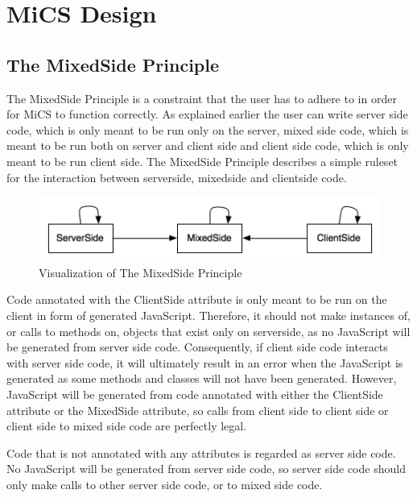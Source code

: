 \chapter{MiCS Design}

	\section{The MixedSide Principle} %
	\label{sub:the_mixedside_principle}
		The MixedSide Principle is a constraint that the user has to adhere to in order for MiCS to function correctly. As explained earlier the user can write server side code, which is only meant to be run only on the server, mixed side code, which is meant to be run both on server and client side and client side code, which is only meant to be run client side. The MixedSide Principle describes a simple ruleset for the interaction between serverside, mixedside and clientside code.

		\begin{figure}[H]
			\begin{center}
				\centerline{\includegraphics[width=12cm]{resources/images/MixedSidePrinciple.png}}
			\end{center}
			\caption{Visualization of The MixedSide Principle}
			\label{fig:MixedSidePrinciple}
		\end{figure}

		Code annotated with the ClientSide attribute is only meant to be run on the client in form of generated JavaScript. Therefore, it should not make instances of, or calls to methods on, objects that exist only on serverside, as no JavaScript will be generated from server side code. Consequently, if client side code interacts with server side code, it will ultimately result in an error when the JavaScript is generated as some methods and classes will not have been generated. However, JavaScript will be generated from code annotated with either the ClientSide attribute or the MixedSide attribute, so calls from client side to client side or client side to mixed side code are perfectly legal.

		Code that is not annotated with any attributes is regarded as server side code. No JavaScript will be generated from server side code, so server side code should only make calls to other server side code, or to mixed side code.

